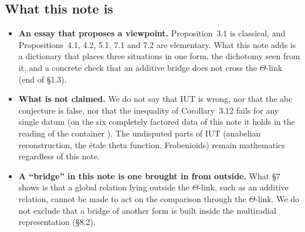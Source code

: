 \documentclass[11pt,a4paper]{article}
\numberwithin{table}{section}
\theoremstyle{plain}
\theoremstyle{definition}
\begin{document}
\subsection{What this note is}
\begin{itemize}
\item \textbf{An essay that proposes a viewpoint.} Proposition~3.1 is classical, and Propositions~4.1, 4.2, 5.1, 7.1
and 7.2 are elementary. What this note adds is a dictionary that places three situations in one form, the dichotomy
seen from it, and a concrete check that an additive bridge does not cross the $\Theta$-link (end of \S1.3).
\item \textbf{What is not claimed.} We do not say that IUT is wrong, nor that the abc conjecture is false, nor that the
inequality of Corollary~3.12 fails for any single datum (on the six completely factored data of this note it holds in
the reading of the container \cite{TC}). The undisputed parts of IUT (anabelian reconstruction, the \'etale theta
function, Frobenioids) remain mathematics regardless of this note.
\item \textbf{A ``bridge'' in this note is one brought in from outside.} What \S7 shows is that a global relation lying
outside the $\Theta$-link, such as an additive relation, cannot be made to act on the comparison through the
$\Theta$-link. We do not exclude that a bridge of another form is built inside the multiradial representation (\S8.2).
\end{itemize}
\end{document}
